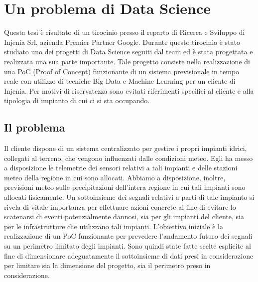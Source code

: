 \chapter{Un problema di Data Science}\label{problema}
Questa tesi è risultato di un tirocinio presso il reparto di Ricerca e Sviluppo di Injenia Srl, azienda Premier Partner Google.  Durante questo tirocinio è stato studiato uno dei progetti di Data Science seguiti dal team ed è stata progettata e realizzata una sua parte importante. Tale progetto consiste nella realizzazione di una PoC (Proof of Concept) funzionante di un sistema previsionale in tempo reale con utilizzo di tecniche Big Data e Machine Learning per un cliente di Injenia.
Per motivi di riservatezza sono evitati riferimenti specifici al cliente e alla tipologia di impianto di cui ci si sta occupando. %
\section{Il problema}
Il cliente dispone di un sistema centralizzato per gestire i propri impianti idrici, collegati al terreno, che vengono influenzati dalle condizioni meteo. Egli ha messo a disposizione le telemetrie dei sensori relativi a tali impianti e delle stazioni meteo della regione in cui sono allocati. Abbiamo a disposizione, inoltre, previsioni meteo sulle precipitazioni dell’intera regione in cui tali impianti sono allocati fisicamente. 
Un sottoinsieme dei segnali relativi a parti di tale impianto si rivela di vitale importanza per effettuare azioni concrete al fine di evitare lo scatenarsi di eventi potenzialmente dannosi, sia per gli impianti del cliente, sia per le infrastrutture che utilizzano tali impianti. L’obiettivo iniziale è la realizzazione di un PoC funzionante per prevedere l’andamento futuro dei segnali su un perimetro limitato degli impianti. Sono quindi state fatte scelte esplicite al fine di dimensionare adeguatamente il sottoinsieme di dati presi in considerazione per limitare sia la dimensione del progetto, sia il perimetro preso in considerazione.

